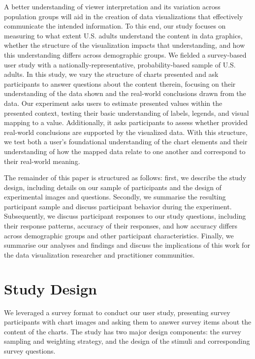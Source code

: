\documentclass{IEEEcsmag}
\begin{document}
A better understanding of viewer interpretation and its variation across population groups will aid in the creation of data visualizations that effectively communicate the intended information. To this end, our study focuses on measuring to what extent U.S. adults understand the content in data graphics, whether the structure of the visualization impacts that understanding, and how this understanding differs across demographic groups. We fielded a survey-based user study with a nationally-representative, probability-based sample of U.S. adults. In this study, we vary the structure of charts presented and ask participants to answer questions about the content therein, focusing on their understanding of the data shown and the real-world conclusions drawn from the data. Our experiment asks users to estimate presented values within the presented context, testing their basic understanding of labels, legends, and visual mapping to a value. Additionally, it asks participants to assess whether provided real-world conclusions are supported by the visualized data. With this structure, we test both a user's foundational understanding of the chart elements and their understanding of how the mapped data relate to one another and correspond to their real-world meaning.

The remainder of this paper is structured as follows: first, we describe the study design, including details on our sample of participants and the design of experimental images and questions. Secondly, we summarise the resulting participant sample and discuss participant behavior during the experiment. Subsequently, we discuss participant responses to our study questions, including their response patterns, accuracy of their responses, and how accuracy differs across demographic groups and other participant characteristics. Finally, we summarise our analyses and findings and discuss the implications of this work for the data visualization researcher and practitioner communities.

\section{Study Design}\label{design}

We leveraged a survey format to conduct our user study, presenting survey participants with chart images and asking them to answer survey items about the content of the charts. The study has two major design components: the survey sampling and weighting strategy, and the design of the stimuli and corresponding survey questions.
\end{document}
